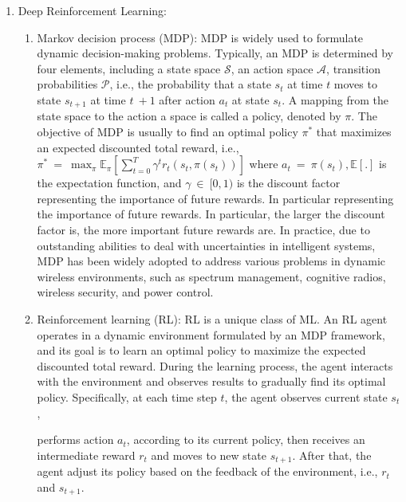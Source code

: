 \documentclass[letterpaper%
, twoside%
, 12pt%
,thesepararticles%
, english%
,creativecommons,hyperref, withAlgo2e%
]{thETS}
\begin{document}
\begin{enumerate}
	\item Deep Reinforcement Learning:
	\begin{enumerate}
		\item {Markov decision process (MDP): MDP is widely used to formulate dynamic decision-making problems. Typically, an MDP is determined by four elements, including a state space $\displaystyle \mathcal{S}$, an action space $\displaystyle \mathcal{A}$, transition probabilities $\displaystyle \mathcal{P}$, i.e., the probability that a state $\displaystyle s_{t}$ at time $\displaystyle t$ moves to state $\displaystyle s_{t+1}$ at time $\displaystyle t\ +1$ after action $\displaystyle a_{t}$ at state $\displaystyle s_{t}$. A mapping from the state space to the action a space is called a policy, denoted by $\displaystyle \pi $. The objective of MDP is usually to find an optimal policy $\displaystyle \pi ^{*}$ that maximizes an expected discounted total reward, i.e., $ $$\displaystyle \pi ^{*} \ =\ \max_{\pi }\mathbb{E}_{\pi }\left[\sum\nolimits ^{T}_{t=0} \gamma ^{t} r_{t}( s_{t} ,\pi ( s_{t}))\right]$ where $\displaystyle a_{t} \ =\ \pi ( s_{t}) ,\mathbb{E}[ .]$ is the expectation function, and $\displaystyle \gamma \ \in \ [ 0,1)$ is the discount factor representing the importance of future rewards.
	 In particular representing the importance of future rewards. In particular, the larger the discount factor is, the more important future rewards are. In practice, due to outstanding abilities to deal with uncertainties in intelligent systems, MDP has been widely adopted to address various problems in dynamic wireless environments, such as spectrum management, cognitive radios, wireless security, and power control. \cite{7080987}}
	 \item {Reinforcement learning (RL): RL is a unique class of ML. An RL agent operates in a dynamic environment formulated by an MDP framework, and its goal is to learn an optimal policy to maximize the expected discounted total reward. During the learning process, the agent interacts with the environment and observes results to gradually find its optimal policy. Specifically, at each time step $\displaystyle t$, the agent observes current state $\displaystyle s_{t}$,

performs action $\displaystyle a_{t}$, according to its current policy, then receives an intermediate reward $\displaystyle r_{t}$ and moves to new  state $\displaystyle s_{t+1}$. After that, the agent adjust its policy based on the feedback of the environment, i.e., $\displaystyle r_{t}$ and $\displaystyle s_{t+1}$.

}
\end{enumerate}
\end{enumerate}
\end{document}
